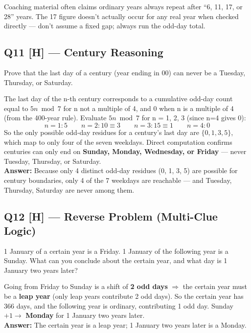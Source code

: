 \documentclass[11pt]{article}
\begin{document}
\begin{warnbox}
Coaching material often claims ordinary years always repeat after ``6, 11, 17, or 28'' years. The 17
figure doesn't actually occur for any real year when checked directly --- don't assume a fixed gap;
always run the odd-day total.
\end{warnbox}

\subsection*{Q11 [H] --- Century Reasoning}
Prove that the last day of a century (year ending in 00) can never be a Tuesday, Thursday, or
Saturday.

\begin{tipbox}[Solution]
The last day of the n-th century corresponds to a cumulative odd-day count equal to $5n \bmod 7$ for
n not a multiple of 4, and $0$ when n is a multiple of 4 (from the 400-year rule). Evaluate
$5n \bmod 7$ for n = 1, 2, 3 (since n=4 gives 0):
\[
n{=}1: 5 \qquad n{=}2: 10\equiv 3 \qquad n{=}3: 15\equiv 1 \qquad n{=}4: 0
\]
So the only possible odd-day residues for a century's last day are $\{0,1,3,5\}$, which map to only
four of the seven weekdays. Direct computation confirms centuries can only end on
\textbf{Sunday, Monday, Wednesday, or Friday} --- never Tuesday, Thursday, or Saturday.\\
\textbf{Answer:} Because only 4 distinct odd-day residues (0, 1, 3, 5) are possible for century
boundaries, only 4 of the 7 weekdays are reachable --- and Tuesday, Thursday, Saturday are never
among them.
\end{tipbox}

\subsection*{Q12 [H] --- Reverse Problem (Multi-Clue Logic)}
1 January of a certain year is a Friday. 1 January of the following year is a Sunday. What can you
conclude about the certain year, and what day is 1 January two years later?

\begin{tipbox}[Solution]
Going from Friday to Sunday is a shift of \textbf{2 odd days} $\Rightarrow$ the certain year must be
a \textbf{leap year} (only leap years contribute 2 odd days). So the certain year has 366 days, and
the following year is ordinary, contributing 1 odd day. Sunday $+1 \to$ \textbf{Monday} for 1
January two years later.\\
\textbf{Answer:} The certain year is a leap year; 1 January two years later is a Monday.
\end{tipbox}
\end{document}
